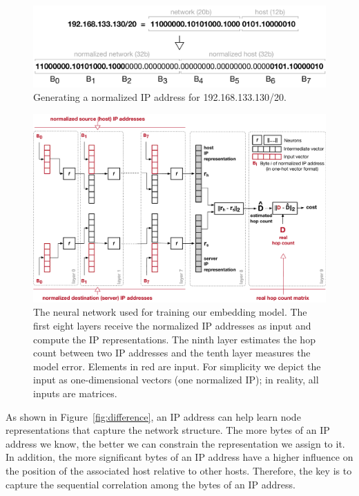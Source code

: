 \begin{figure}
	\includegraphics[width=\linewidth]{Graph/dip/normalized-ip}
	\caption{Generating a normalized IP address for 192.168.133.130/20.}
	\label{fig:normalizedip}
\end{figure}

\begin{figure}[t]
	\includegraphics[width=.9\textwidth]{Graph/dip/neural-network-2}
	\caption{The neural network used for training our embedding model. The first eight layers receive the normalized IP addresses as input and compute the IP representations. The ninth layer estimates the hop count between two IP addresses and the tenth layer measures the model error. Elements in red are input. For simplicity we depict the input as one-dimensional vectors (one normalized IP); in reality, all inputs are matrices.}
	\label{fig:neuralnetwork}
\end{figure}

As shown in Figure~\ref{fig:difference}, an IP address can help learn node representations that capture the network structure. The more bytes of an IP address we know, the better we can constrain the representation we assign to it. In addition, the more significant bytes of an IP address have a higher influence on the position of the associated host relative to other hosts. Therefore, the key is to capture the sequential correlation among the bytes of an IP address. %

